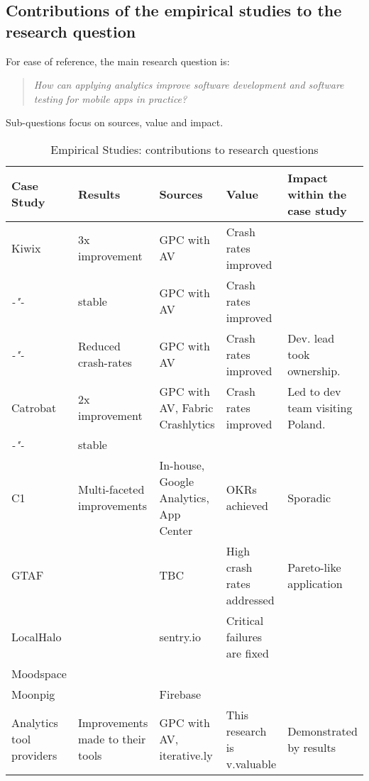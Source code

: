 \subsection{Contributions of the empirical studies to the research question}
For ease of reference, the main research question is:
\begin{quote}
    \emph{How can applying analytics improve software development and software testing for mobile apps in practice?}    
\end{quote}
Sub-questions focus on sources, value and impact. 
\begin{landscape} %
\begin{table}
    \centering
    \tabcolsep=0.06cm
    \tiny
    \begin{tabular}{lllll}\toprule
    Case Study                  &Results                &Sources                &Value             &Impact within the case study  \\
    \midrule
    Kiwix                       &3x improvement         &GPC with AV            &Crash rates improved &  \\ 
     \textit{-"-}               &stable                 &GPC with AV            &Crash rates improved &  \\
     \textit{-"-}               &Reduced crash-rates    &GPC with AV            &Crash rates improved & Dev. lead took ownership. \\
     \midrule
    Catrobat                    &2x improvement         &GPC with AV, Fabric Crashlytics &Crash rates improved &Led to dev team visiting Poland. \\
     \textit{-"-}               &stable                &   &                  & \\
     \midrule
    C1                          &Multi-faceted improvements &In-house, Google Analytics, App Center &OKRs achieved &Sporadic \\
    GTAF                        &                      &TBC &High crash rates addressed &Pareto-like application \\
    LocalHalo                   &                      &sentry.io &Critical failures are fixed & \\
    Moodspace                   &                      & & & \\
    Moonpig                     &                      &Firebase & & \\
    Analytics tool providers    &Improvements made to their tools &GPC with AV, iterative.ly  &This research is v.valuable &Demonstrated by results \\
    \bottomrule
    \end{tabular}
    \caption{Empirical Studies: contributions to research questions}
    \label{tab:empirical-studies-contributions-to-research-questions}
\end{table}
\end{landscape}